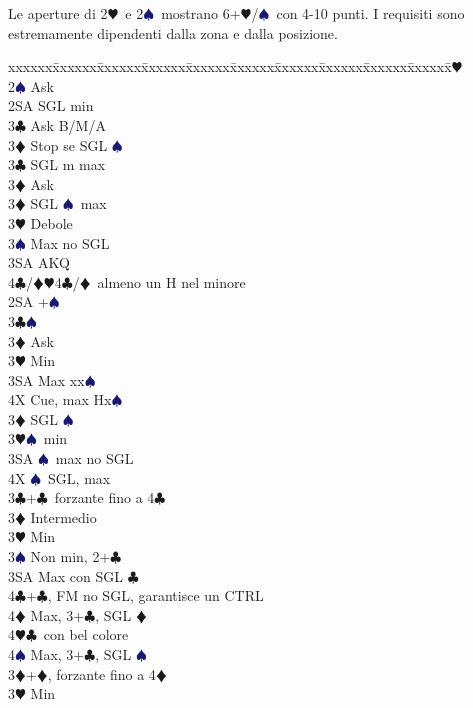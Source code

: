 \documentclass[a4paper,italian]{article}
\newcommand{\BC}{\textcolor{OliveGreen}{$\clubsuit$}}
\newcommand{\BD}{\textcolor{RedOrange}{$\vardiamondsuit$}}
\newcommand{\BH}{\textcolor{Red2}{$\varheartsuit${}}}
\newcommand{\BS}{\textcolor{MidnightBlue}{$\spadesuit${}}}
\newenvironment{bidtable}
{\begin{tabbing}

    xxxxxx\=xxxxxx\=xxxxxx\=xxxxxx\=xxxxxx\=xxxxxx\=xxxxxx\=xxxxxx\=xxxxxx\=xxxxxx\=\kill}
{\end{tabbing} }%
\begin{document}
\begin{multicols*}{2}
    Le aperture di 2\BH\ e 2\BS\ mostrano 6+\BH/\BS\ con 4-10 punti. I requisiti sono estremamente dipendenti
    dalla zona e dalla posizione.
    \begin{bidtable}
        2\BH\+\\
        2\BS \> Ask\+\\
        2SA \> SGL min\+\\
        3\BC \> Ask B/M/A\\
        3\BD \> Stop se SGL \BS \-\\
        3\BC \> SGL m max\+\\
        3\BD \> Ask\-\\
        3\BD \> SGL \BS\ max\\
        3\BH \> Debole\\
        3\BS \> Max no SGL\\
        3SA \> AKQ\\
        4\BC/\BD {}\BH 4\BC /\BD\ almeno un H nel minore\-\\
        2SA +\BS \+\\
        3\BC {}\BS \+\\
        3\BD \> Ask\+\\
        3\BH \> Min\\
        3SA \> Max xx\BS \\
        4X \> Cue, max Hx\BS\-\-\\
        3\BD \> SGL \BS \\
        3\BH {}\BS\ min\\
        3SA \BS\ max no SGL\\
        4X \BS\ SGL, max\-\\
        3\BC {}+\BC\ forzante fino a 4\BC\+\\
        3\BD \> Intermedio\\
        3\BH\> Min\\
        3\BS\> Non min, 2+\BC\\
        3SA\> Max con SGL \BC\\
        4\BC{}+\BC, FM no SGL, garantisce un CTRL\\
        4\BD\> Max, 3+\BC, SGL \BD\\
        4\BH{}\BC\ con bel colore\\
        4\BS\> Max, 3+\BC, SGL \BS\-\\
        3\BD {}+\BD, forzante fino a 4\BD\+\\
        3\BH\> Min\\

\end{bidtable}
\end{multicols*}
\end{document}
